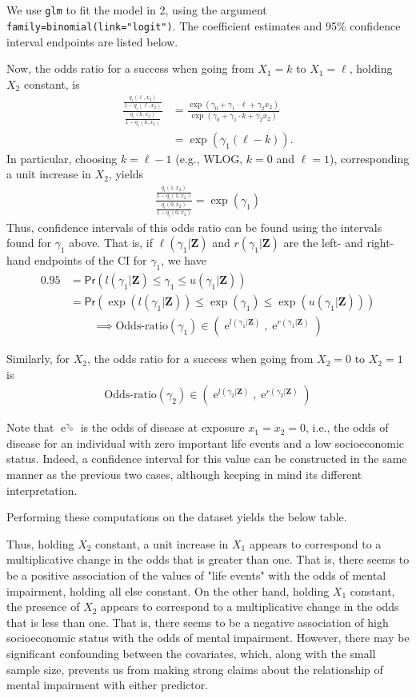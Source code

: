 \documentclass[11pt]{article}
\newcommand*\ba{\[ \begin{aligned}}
\newcommand*\ea{\end{aligned} \]}
\newcommand*\bZ{\mathbf{Z}}
\newcommand\e{\operatorname{e}}
\renewcommand\;{\,}
\renewcommand\Pr[1]{ \mathsf{Pr}\left(#1\right) }
\begin{document}
\section{}
We use \texttt{glm} to fit the model in 2, using the argument
\texttt{family=binomial(link="logit")}. 
The coefficient estimates and 95\% confidence interval endpoints are listed below.



Now, the odds ratio for a success when going from $X_1 = k$ to $X_1 = \ell$, holding $X_2$ constant, is
\ba
\frac{ \frac{q_i(\ell, x_2)}{1 - q_i(\ell, x_2)} }
	{ \frac{q_i(k, x_2)}{1 - q_i(k, x_2) } }
	& = \frac{ \exp\left(\gamma_0 + \gamma_1 \cdot \ell + \gamma_2 x_2\right) }
		{ \exp\left(\gamma_0 + \gamma_1 \cdot k + \gamma_2 x_2\right) } \\
	& = \exp(\gamma_1(\ell - k)).
\ea
In particular, choosing $k = \ell - 1$ (e.g., WLOG, 
$k = 0$ and $\ell = 1$), corresponding a unit increase in $X_2$, yields
\ba
\frac{ \frac{q_i(1, x_2)}{1 - q_i(1, x_2)} }
	{ \frac{q_i(0, x_2)}{1 - q_i(0, x_2) } }
	= \exp(\gamma_1)
\ea
Thus, confidence intervals of this odds ratio can be found using the intervals found for $\gamma_1$ above. That is, if $\ell(\gamma_1 | \bZ)$ and $r(\gamma_1 | \bZ)$ are the left- and right-hand endpoints of the CI for $\gamma_1$, we have
\ba
0.95 & = \Pr{ l(\gamma_1| \bZ) \le \gamma_1 \le u(\gamma_1 | \bZ) } \\
	& = \Pr{ \exp(l(\gamma_1| \bZ)) \le \exp(\gamma_1) \le 
		\exp(u(\gamma_1 | \bZ)) } 
\ea
\ba
\implies \text{Odds-ratio}(\gamma_1) \in \left( \e^{l(\gamma_1|\bZ)},
	\e^{r(\gamma_1|\bZ)}  \right)
\ea

Similarly, for $X_2$, the odds ratio for a success when going from $X_2 = 0$ to $X_2 = 1$ is
\ba
\text{Odds-ratio}(\gamma_2) \in \left( \e^{l(\gamma_2|\bZ)},
	\e^{r(\gamma_2|\bZ)}  \right)
\ea

Note that $\e^{\gamma_0}$ is the odds of disease at exposure $x_1 = x_2 = 0$, i.e., the odds of disease for an individual with zero important life events and a low socioeconomic status. Indeed, a confidence interval for this value can be constructed in the same manner as the previous two cases, although keeping in mind its different interpretation.

Performing these computations on the dataset yields the below table.



Thus, holding $X_2$ constant, a unit increase in $X_1$ appears to correspond to a multiplicative change in the odds that is greater than one. That is, there seems to be a positive association of the values of "life events" with the odds of mental impairment, holding all else constant. On the other hand, holding $X_1$ constant, the presence of $X_2$ appears to correspond to a multiplicative change in the odds that is less than one. That is, there seems to be a negative association of high socioeconomic status with the odds of mental impairment. However, there may be significant confounding between the covariates, which, along with the small sample size, prevents us from making strong claims about the relationship of mental impairment with either predictor.
\end{document}
